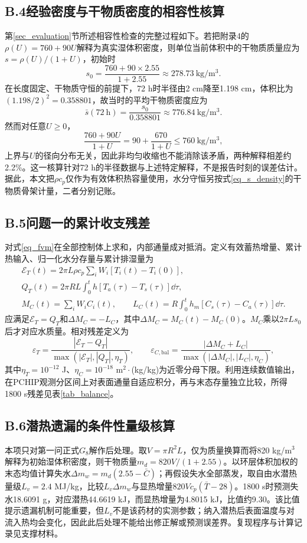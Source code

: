 \subsection*{B.4\quad 经验密度与干物质密度的相容性核算}
第\ref{sec_evaluation}节所述相容性检查的完整过程如下。若把附录4的$\rho(U)=760+90U$解释为真实湿体积密度，则单位当前体积中的干物质质量应为$s=\rho(U)/(1+U)$，初始时
\[
s_0=\frac{760+90\times2.55}{1+2.55}\approx278.73\ \mathrm{kg/m^3}.
\]
在长度固定、干物质守恒的前提下，72 h时半径由2 cm降至1.198 cm，体积比为$(1.198/2)^2=0.358801$，故当时的平均干物质密度应为
\[
\bar s(72\ \mathrm h)=\frac{s_0}{0.358801}\approx776.84\ \mathrm{kg/m^3}.
\]
然而对任意$U\ge0$，
\[
\frac{760+90U}{1+U}=90+\frac{670}{1+U}\le760\ \mathrm{kg/m^3},
\]
上界与$U$的径向分布无关，因此非均匀收缩也不能消除该矛盾，两种解释相差约2.2\%。这一核算针对72 h的半径数据与上述特定解释，不是报告时刻的误差估计。据此，本文把$\rho c_p$仅作为有效体积热容量使用，水分守恒另按式\eqref{eq_s_density}的干物质骨架计量，二者分别记账。

\subsection*{B.5\quad 问题一的累计收支残差}
对式\eqref{eq_fvm}在全部控制体上求和，内部通量成对抵消。定义有效蓄热增量、累计热输入、归一化水分存量与累计排湿量为
\begin{equation}\label{eq_q1_balance}
\begin{gathered}
\mathcal E_T(t)=2\pi L\rho c_p\sum_iW_i[T_i(t)-T_i(0)],\\
Q_T(t)=2\pi RL\int_0^t h[T_a(\tau)-T_s(\tau)]\dd\tau,\\
M_C(t)=\sum_iW_iC_i(t),\qquad
L_C(t)=R\int_0^t h_m[C_s(\tau)-C_a(\tau)]\dd\tau.
\end{gathered}
\end{equation}
应满足$\mathcal E_T=Q_T$和$\Delta M_C=-L_C$，其中$\Delta M_C=M_C(t)-M_C(0)$。$M_C$乘以$2\pi Ls_0$后才对应水质量。相对残差定义为
\begin{equation}\label{eq_q1_balance_residual}
\varepsilon_T=\frac{|\mathcal E_T-Q_T|}{\max(|\mathcal E_T|,|Q_T|,\eta_T)},\qquad
\varepsilon_{C,\mathrm{bal}}=\frac{|\Delta M_C+L_C|}{\max(|\Delta M_C|,|L_C|,\eta_C)},
\end{equation}
其中$\eta_T=10^{-12}$ J、$\eta_C=10^{-18}$ m$^2\cdot$(kg/kg)为近零分母下限。利用连续数值输出，在PCHIP观测分区间上对表面通量自适应积分，再与末态存量独立比较，所得1800 s残差见表\ref{tab_balance}。

\subsection*{B.6\quad 潜热遗漏的条件性量级核算}
本项只对第一问正式$G_8$解作后处理。取$V=\pi R^2L$，仅为质量换算而将820 kg/m$^3$解释为初始湿体积密度，则干物质量$m_d=820V/(1+2.55)$。以环层体积加权的末态均值计算失水$\Delta m_w=m_d(2.55-\bar C)$；再假设失水全部蒸发，取自由水潜热量级$L_v=2.4$ MJ/kg，比较$L_v\Delta m_w$与显热增量$820Vc_p(\bar T-28)$。1800 s时预测失水18.6091 g，对应潜热44.6619 kJ，而显热增量为4.8015 kJ，比值约9.30。该比值提示遗漏机制可能重要，但$L_v$不是该药材的实测参数；纳入潜热后表面温度与对流入热均会变化，因此此后处理不能给出修正解或预测误差界。复现程序与计算记录见支撑材料。
